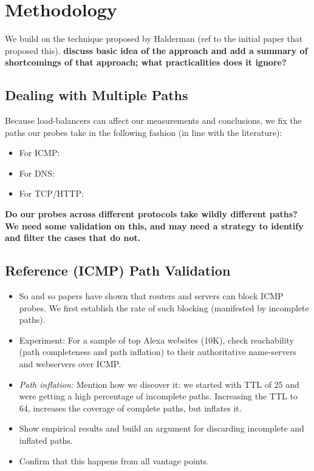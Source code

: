 \section{Methodology}\label{sec:methodology}
We build on the technique proposed by Halderman (ref to the initial paper that
proposed this).
\textbf{ discuss basic idea of the approach and add a summary of shortcomings
of that approach; what practicalities does it ignore?} 

\subsection{Dealing with Multiple Paths}
Because load-balancers can affect our measurements and conclusions, we fix the
paths our probes take in the following fashion (in line with the literature):
\begin{itemize}
    \item For ICMP:
    \item For DNS:
    \item For TCP/HTTP:
\end{itemize}
\textbf{Do our probes across different protocols take wildly different paths?
We need some validation on this, and may need a strategy to identify and filter
the cases that do not.}

\subsection{Reference (ICMP) Path Validation}
\begin{itemize}
    \item So and so papers have shown that routers and servers can block ICMP
        probes.  We first establish the rate of such blocking (manifested by
        incomplete paths).
     \item Experiment: For a sample of top Alexa websites (10K), check
         reachability (path completeness and path inflation) to their
         authoritative name-servers and webservers over ICMP.  
     \item \textit{Path inflation:} Mention how we discover it: we started with
         TTL of 25 and were getting a high percentage of incomplete paths.
         Increasing the TTL to 64, increases the coverage of complete paths,
         but inflates it.
     \item Show empirical results and build an argument for discarding
         incomplete and inflated paths.
     \item Confirm that this happens from all vantage points.
\end{itemize}

